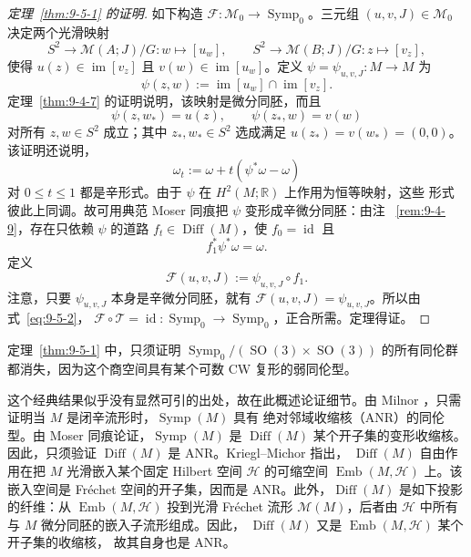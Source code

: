 \begin{proof}[定理~\ref{thm:9-5-1} 的证明]
如下构造 $\mathcal F:\mathcal M_0\to\operatorname{Symp}_0$。三元组
$(u,v,J)\in\mathcal M_0$ 决定两个光滑映射
\[
  S^2\longrightarrow\mathcal M(A;J)/G:w\longmapsto[u_w],
  \qquad
  S^2\longrightarrow\mathcal M(B;J)/G:z\longmapsto[v_z],
\]
使得 $u(z)\in\operatorname{im}[v_z]$ 且
$v(w)\in\operatorname{im}[u_w]$。定义
$\psi=\psi_{u,v,J}:M\to M$ 为
\[
  \psi(z,w):=\operatorname{im}[u_w]\cap\operatorname{im}[v_z].
\]
定理~\ref{thm:9-4-7} 的证明说明，该映射是微分同胚，而且
\begin{equation}\label{eq:9-5-2}
  \psi(z,w_*)=u(z),
  \qquad \psi(z_*,w)=v(w)
\end{equation}
对所有 $z,w\in S^2$ 成立；其中 $z_*,w_*\in S^2$ 选成满足
$u(z_*)=v(w_*)=(0,0)$。该证明还说明，
\[
  \omega_t:=\omega+t(\psi^*\omega-\omega)
\]
对 $0\le t\le1$ 都是辛形式。由于 $\psi$ 在 $H^2(M;\mathbb R)$ 上作用为恒等映射，这些
形式彼此上同调。故可用典范 Moser 同痕把 $\psi$ 变形成辛微分同胚：由注
~\ref{rem:9-4-9}，存在只依赖 $\psi$ 的道路 $f_t\in\operatorname{Diff}(M)$，使
$f_0=\operatorname{id}$ 且
\[
  f_1^*\psi^*\omega=\omega.
\]
定义
\[
  \mathcal F(u,v,J):=\psi_{u,v,J}\circ f_1.
\]
注意，只要 $\psi_{u,v,J}$ 本身是辛微分同胚，就有
$\mathcal F(u,v,J)=\psi_{u,v,J}$。所以由式~\eqref{eq:9-5-2}，
$\mathcal F\circ\mathcal T=\operatorname{id}:\operatorname{Symp}_0\to
\operatorname{Symp}_0$，正合所需。定理得证。
\end{proof}


\begin{remark}\label{rem:9-5-5}
定理~\ref{thm:9-5-1} 中，只须证明
$\operatorname{Symp}_0/(\operatorname{SO}(3)\times\operatorname{SO}(3))$ 的所有同伦群
都消失，因为这个商空间具有某个可数 CW 复形的弱同伦型。

这个经典结果似乎没有显然可引的出处，故在此概述论证细节。由 Milnor
，只需证明当 $M$ 是闭辛流形时，$\operatorname{Symp}(M)$ 具有
绝对邻域收缩核（ANR）的同伦型。由 Moser 同痕论证，$\operatorname{Symp}(M)$ 是
$\operatorname{Diff}(M)$ 某个开子集的变形收缩核。因此，只须验证
$\operatorname{Diff}(M)$ 是 ANR。Kriegl--Michor  指出，
$\operatorname{Diff}(M)$ 自由作用在把 $M$ 光滑嵌入某个固定 Hilbert 空间
$\mathcal H$ 的可缩空间 $\operatorname{Emb}(M,\mathcal H)$ 上。该嵌入空间是 Fréchet
空间的开子集，因而是 ANR。此外，$\operatorname{Diff}(M)$ 是如下投影的纤维：从
$\operatorname{Emb}(M,\mathcal H)$ 投到光滑 Fréchet 流形 $\mathcal M(M)$，后者由
$\mathcal H$ 中所有与 $M$ 微分同胚的嵌入子流形组成。因此，
$\operatorname{Diff}(M)$ 又是 $\operatorname{Emb}(M,\mathcal H)$ 某个开子集的收缩核，
故其自身也是 ANR。
\end{remark}

